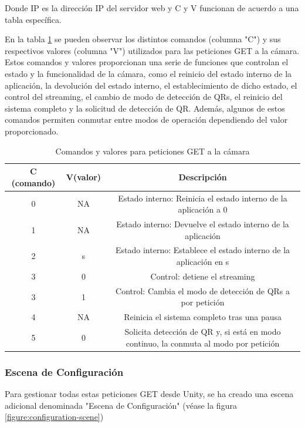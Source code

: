Donde IP es la dirección IP del servidor web y C y V funcionan de acuerdo a una tabla específica.

En la tabla \ref{table:cam_commands} se pueden observar los distintos comandos (columna "C") y sus respectivos valores (columna "V") utilizados para las peticiones GET a la cámara. Estos comandos y valores proporcionan una serie de funciones que controlan el estado y la funcionalidad de la cámara, como el reinicio del estado interno de la aplicación, la devolución del estado interno, el establecimiento de dicho estado, el control del streaming, el cambio de modo de detección de QRs, el reinicio del sistema completo y la solicitud de detección de QR. Además, algunos de estos comandos permiten conmutar entre modos de operación dependiendo del valor proporcionado.

\begin{table}[!htb]
\begin{adjustbox}{width=\textwidth,center}
\begin{tabular}{|c|c|c|}
\hline
\textbf{C (comando)} & \textbf{V(valor)} & \textbf{Descripción} \\
\hline
0 & NA & Estado interno: Reinicia el estado interno de la aplicación a 0 \\
\hline
1 & NA & Estado interno: Devuelve el estado interno de la aplicación \\
\hline
2 & s & Estado interno: Establece el estado interno de la aplicación en s \\
\hline
3 & 0 & Control: detiene el streaming \\
\hline
3 & 1 & Control: Cambia el modo de detección de QRs a por petición \\
\hline
4 & NA & Reinicia el sistema completo tras una pausa \\
\hline
5 & 0 & Solicita detección de QR y, si está en modo continuo, la conmuta al modo por petición \\
\hline
\end{tabular}
\end{adjustbox}
\caption{Comandos y valores para peticiones GET a la cámara}
\label{table:cam_commands}
\end{table}

\subsubsection{Escena de Configuración}

Para gestionar todas estas peticiones GET desde Unity, se ha creado una escena adicional denominada "Escena de Configuración" (véase la figura \ref{figure:configuration-scene})

